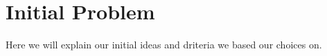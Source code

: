 \chapter{Initial Problem}\label{ch:ch2label}
Here we will explain our initial ideas and driteria we based our choices on.





